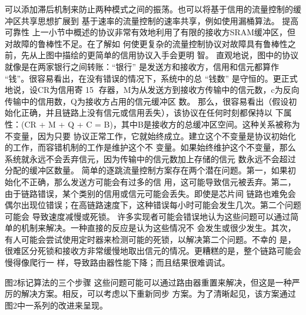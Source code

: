 可以添加滞后机制来防止两种模式之间的振荡。也可以将基于信用的流量控制的缓冲区共享思想扩展到
基于速率的流量控制的速率共享，例如使用漏桶算法。
提高可靠性
上一小节中概述的协议非常有效地利用了有限的接收方SRAM缓冲区，但对故障的鲁棒性不足。在了解如
何使更复杂的流量控制协议对故障具有鲁棒性之前，先从上图中描绘的更简单的信用协议入手会更明
智。
直观地说，图中的协议就像是在两家银行之间转账：“银行” 是发送方和接收方，信用和信元都算作
“钱”。很容易看出，在没有错误的情况下，系统中的总 “钱数” 是守恒的。更正式地说，设CR为信用寄
                                                  15
存器，M为从发送方到接收方传输中的信元数，c为反向传输中的信用数，Q为接收方占用的信元缓冲区
数。
那么，很容易看出（假设初始化正确，并且链路上没有信元或信用丢失），该协议在任何时刻都保持以
下属性：(CR + M + Q + C = B)，其中B是接收方的总缓冲区空间。这种关系被称为不变量，因为只要
协议正常工作，它就始终成立。建立这个不变量是协议初始化的工作，而容错机制的工作是维护这个不
变量。如果始终维护这个不变量，那么系统就永远不会丢弃信元，因为传输中的信元数加上存储的信元
数永远不会超过分配的缓冲区数量。
简单的逐跳流量控制方案存在两个潜在问题。第一，如果初始化不正确，那么发送方可能会有过多的信
用，这可能导致信元被丢弃。第二，由于链路错误，某个类别的信用或信元可能会丢失。即使是芯片间
链路也难免会偶尔出现位错误；在高链路速度下，这种错误每小时可能会发生几次。第二个问题可能会
导致速度减慢或死锁。
许多实现者可能会错误地认为这些问题可以通过简单的机制来解决。一种直接的反应是认为这些情况不
会发生或很少发生。其次，有人可能会尝试使用定时器来检测可能的死锁，以解决第二个问题。不幸的
是，很难区分死锁和接收方非常缓慢地取出信元的情况。更糟糕的是，整个链路可能会慢得像爬行一
样，导致路由器性能下降；而且结果很难调试。




                  图2标记算法的三个步骤
这些问题可能可以通过路由器重置来解决，但这是一种严厉的解决方案。相反，可以考虑以下重新同步
方案。为了清晰起见，该方案通过图2中一系列的改进来呈现。

